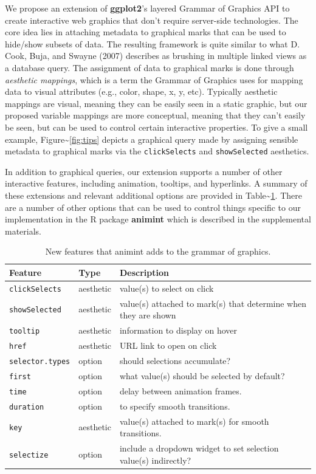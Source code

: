 \documentclass[12pt,]{article}
\theoremstyle{definition}
\theoremstyle{definition}
\theoremstyle{definition}
\theoremstyle{remark}
\begin{document}
We propose an extension of \textbf{ggplot2}'s layered Grammar of
Graphics API to create interactive web graphics that don't require
server-side technologies. The core idea lies in attaching metadata to
graphical marks that can be used to hide/show subsets of data. The
resulting framework is quite similar to what D. Cook, Buja, and Swayne
(2007) describes as brushing in multiple linked views as a database
query. The assignment of data to graphical marks is done through
\emph{aesthetic mappings}, which is a term the Grammar of Graphics uses
for mapping data to visual attributes (e.g., color, shape, x, y, etc).
Typically aesthetic mappings are visual, meaning they can be easily seen
in a static graphic, but our proposed variable mappings are more
conceptual, meaning that they can't easily be seen, but can be used to
control certain interactive properties. To give a small example,
Figure\textasciitilde{}\ref{fig:tips} depicts a graphical query made by
assigning sensible metadata to graphical marks via the
\texttt{clickSelects} and \texttt{showSelected} aesthetics.

In addition to graphical queries, our extension supports a number of
other interactive features, including animation, tooltips, and
hyperlinks. A summary of these extensions and relevant additional
options are provided in Table\textasciitilde{}\ref{tab:overview}. There
are a number of other options that can be used to control things
specific to our implementation in the R package \textbf{animint} which
is described in the supplemental materials.

\begin{table}

\caption{
New features that animint adds to the grammar of graphics.
}\label{tab:overview}
\small
\begin{tabularx}{\textwidth}{|l|l|l|}
\hline
Feature & Type & Description \\
\hline
\texttt{clickSelects} & aesthetic & value(s) to select on click \\
\texttt{showSelected} & aesthetic & value(s) attached to mark(s) that determine when they are shown  \\
\texttt{tooltip} & aesthetic & information to display on hover \\
\texttt{href} & aesthetic & URL link to open on click \\
\texttt{selector.types} & option & should selections accumulate?  \\
\texttt{first} & option & what value(s) should be selected by default?  \\
\texttt{time} & option & delay between animation frames.  \\
\texttt{duration} & option & to specify smooth transitions.  \\
\texttt{key} & aesthetic & value(s) attached to mark(s) for smooth transitions. \\
\texttt{selectize} & option & include a dropdown widget to set selection value(s) indirectly? \\
\hline
\end{tabularx}

\end{table}
\end{document}

